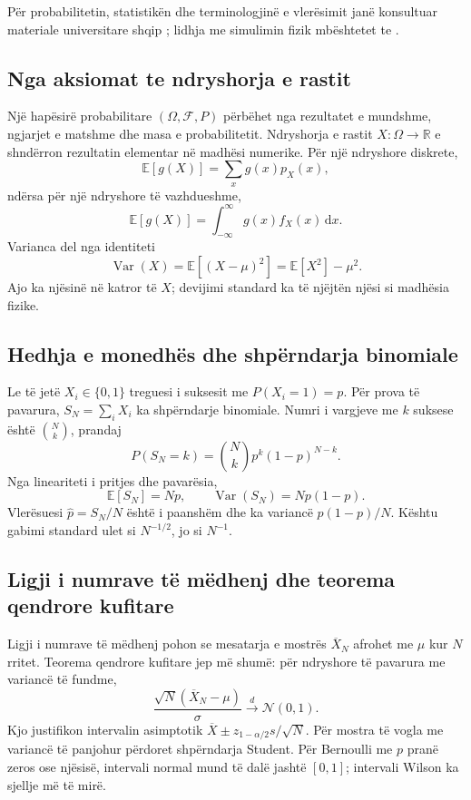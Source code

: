 \documentclass[11pt,oneside,openany]{book}
\newcommand{\E}{\mathbb{E}}
\newcommand{\Var}{\operatorname{Var}}
\newcommand{\R}{\mathbb{R}}
\newcommand{\dd}{\,\mathrm{d}}
\begin{document}
Për probabilitetin, statistikën dhe terminologjinë e vlerësimit janë konsultuar materiale universitare shqip \cite{capollari,butka,tasho}; lidhja me simulimin fizik mbështetet te \cite{newman,landau}.



\subsection{Nga aksiomat te ndryshorja e rastit}
Një hapësirë probabilitare $(\Omega,\mathcal F,P)$ përbëhet nga rezultatet e mundshme, ngjarjet e matshme dhe masa e probabilitetit. Ndryshorja e rastit $X:\Omega\to\R$ e shndërron rezultatin elementar në madhësi numerike. Për një ndryshore diskrete,
\begin{equation}
 \E[g(X)]=\sum_x g(x)p_X(x),
\end{equation}
ndërsa për një ndryshore të vazhdueshme,
\begin{equation}
 \E[g(X)]=\int_{-\infty}^{\infty}g(x)f_X(x)\dd x.
\end{equation}
Varianca del nga identiteti
\begin{equation}
 \Var(X)=\E[(X-\mu)^2]=\E[X^2]-\mu^2.
\end{equation}
Ajo ka njësinë në katror të $X$; devijimi standard ka të njëjtën njësi si madhësia fizike.

\subsection{Hedhja e monedhës dhe shpërndarja binomiale}
Le të jetë $X_i\in\{0,1\}$ treguesi i suksesit me $P(X_i=1)=p$. Për prova të pavarura, $S_N=\sum_iX_i$ ka shpërndarje binomiale. Numri i vargjeve me $k$ suksese është $\binom Nk$, prandaj
\begin{equation}
 P(S_N=k)=\binom Nk p^k(1-p)^{N-k}.
\end{equation}
Nga lineariteti i pritjes dhe pavarësia,
\begin{equation}
 \E[S_N]=Np,\qquad \Var(S_N)=Np(1-p).
\end{equation}
Vlerësuesi $\widehat p=S_N/N$ është i paanshëm dhe ka variancë $p(1-p)/N$. Kështu gabimi standard ulet si $N^{-1/2}$, jo si $N^{-1}$.

\subsection{Ligji i numrave të mëdhenj dhe teorema qendrore kufitare}
Ligji i numrave të mëdhenj pohon se mesatarja e mostrës $\overline X_N$ afrohet me $\mu$ kur $N$ rritet. Teorema qendrore kufitare jep më shumë: për ndryshore të pavarura me variancë të fundme,
\begin{equation}
 \frac{\sqrt N(\overline X_N-\mu)}{\sigma}
 \xrightarrow{d}\mathcal N(0,1).
\end{equation}
Kjo justifikon intervalin asimptotik $\overline X\pm z_{1-\alpha/2}s/\sqrt N$. Për mostra të vogla me variancë të panjohur përdoret shpërndarja Student. Për Bernoulli me $p$ pranë zeros ose njësisë, intervali normal mund të dalë jashtë $[0,1]$; intervali Wilson ka sjellje më të mirë.
\end{document}
